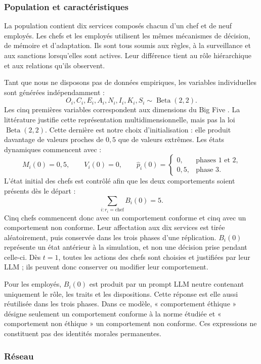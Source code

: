 \documentclass[10pt,a4paper]{article}
\begin{document}
\subsubsection{Population et caractéristiques}

La population contient dix services composés chacun d’un chef et de neuf
employés. Les chefs et les employés utilisent les mêmes mécanismes de décision,
de mémoire et d’adaptation. Ils sont tous soumis aux règles, à la surveillance
et aux sanctions lorsqu’elles sont actives. Leur différence tient au rôle
hiérarchique et aux relations qu’ils observent.

Tant que nous ne disposons pas de données empiriques, les variables
individuelles sont générées indépendamment :
\[
O_i,C_i,E_i,A_i,N_i,I_i,K_i,S_i\sim\operatorname{Beta}(2,2).
\]
Les cinq premières variables correspondent aux dimensions du Big Five
\cite{costa1992}. La littérature justifie cette représentation
multidimensionnelle, mais pas la loi $\operatorname{Beta}(2,2)$. Cette dernière
est notre choix d’initialisation : elle produit davantage de valeurs proches de
$0{,}5$ que de valeurs extrêmes. Les états dynamiques commencent avec :
\[
M_i(0)=0{,}5,\qquad V_i(0)=0,\qquad
\widehat p_i(0)=
\begin{cases}
0,&\text{phases 1 et 2},\\
0{,}5,&\text{phase 3}.
\end{cases}
\]
L’état initial des chefs est contrôlé afin que les deux comportements soient
présents dès le départ :
\[
\sum_{i:r_i=\mathrm{chef}} B_i(0)=5.
\]
Cinq chefs commencent donc avec un comportement conforme et cinq avec un
comportement non conforme. Leur affectation aux dix services est tirée
aléatoirement, puis conservée dans les trois phases d’une réplication.
$B_i(0)$ représente un état antérieur à la simulation, et non une décision
prise pendant celle-ci. Dès $t=1$, toutes les actions des chefs sont choisies
et justifiées par leur LLM ; ils peuvent donc conserver ou modifier leur
comportement.

Pour les employés, $B_i(0)$ est produit par un prompt LLM neutre contenant
uniquement le rôle, les traits et les dispositions. Cette réponse est elle
aussi réutilisée dans les trois phases. Dans ce modèle, « comportement
éthique » désigne seulement un comportement conforme à la norme étudiée et
« comportement non éthique » un comportement non conforme. Ces expressions ne
constituent pas des identités morales permanentes.

\subsubsection{Réseau}
\end{document}
